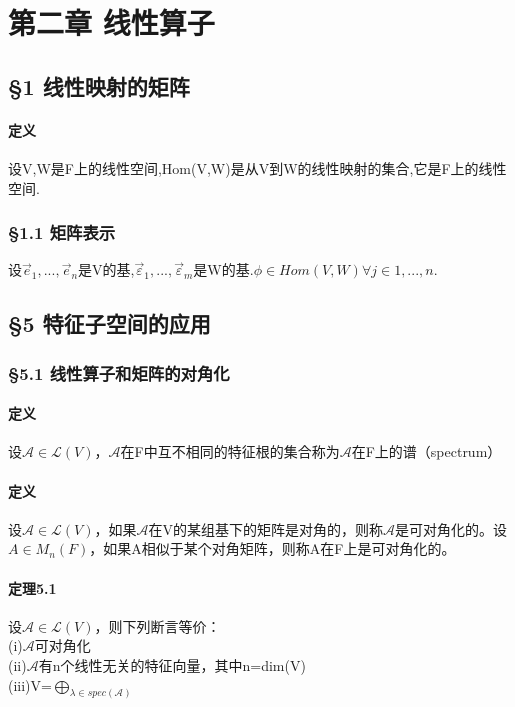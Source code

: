 \documentclass{ctexart}
\begin{document}
\fi

\section{第二章 线性算子}

\subsection{§1 线性映射的矩阵}

\paragraph{定义}
设V,W是F上的线性空间,Hom(V,W)是从V到W的线性映射的集合,它是F上的线性空间.

\subsubsection{§1.1 矩阵表示}

设$\vec{e}_{1},...,\vec{e}_{n}$是V的基,$\vec{\varepsilon}_{1},...,\vec{\varepsilon}_{m}$是W的基.$\phi  \in Hom(V,W)    \forall j \in 1,...,n$. 

\subsection{§5 特征子空间的应用}

\subsubsection{§5.1 线性算子和矩阵的对角化}

\paragraph{定义}
设$\mathcal{A}\in\mathcal{L}(V)$，$\mathcal{A}$在F中互不相同的特征根的集合称为$\mathcal{A}$在F上的谱（spectrum）

\paragraph{定义}
设$\mathcal{A}\in\mathcal{L}(V)$，如果$\mathcal{A}$在V的某组基下的矩阵是对角的，则称$\mathcal{A}$是可对角化的。设$A \in M_{n}(F)$，如果A相似于某个对角矩阵，则称A在F上是可对角化的。

\paragraph{定理5.1}
设$\mathcal{A}\in \mathcal{L}(V)$，则下列断言等价：\\
(i)$\mathcal{A}$可对角化\\
(ii)$\mathcal{A}$有n个线性无关的特征向量，其中n=dim(V)\\
(iii)V=$\bigoplus_{\lambda \in spec(\mathcal{A})}$\\
\end{document}
